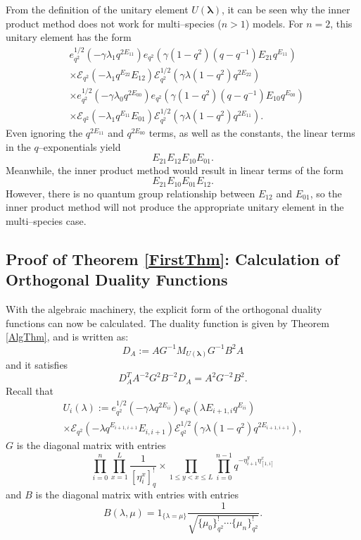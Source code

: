 \documentclass{ximera}
\begin{document}
\begin{remark}\label{InnerProductRemark}
From the definition of the unitary element $U(\boldsymbol{\lambda})$, it can be seen why the inner product method does not work for multi--species ($n>1$) models. For $n=2$, this unitary element has the form
\begin{align*}
&e_{q^2}^{1/2}(-\gamma \lambda_1 q^{2E_{11}}) e_{q^2}(\gamma (1-q^2)(q-q^{-1})E_{21}q^{E_{11}})\\
&\times\mathcal{E}_{q^2}(-\lambda_1 q^{E_{22}}E_{12}) \mathcal{E}_{q^2}^{1/2}(\gamma \lambda (1-q^2)q^{2E_{22}})\\
&\times e_{q^2}^{1/2}(-\gamma \lambda_0 q^{2E_{00}}) e_{q^2}(\gamma (1-q^2)(q-q^{-1})E_{10}q^{E_{00}}) \\
&\times\mathcal{E}_{q^2}(-\lambda_1 q^{E_{11}}E_{01}) \mathcal{E}_{q^2}^{1/2}(\gamma \lambda (1-q^2)q^{2E_{11}}).
\end{align*}
Even ignoring the $q^{2E_{11}}$ and $q^{2E_{00}}$ terms, as well as the constants, the linear terms in the $q$--exponentials yield
$$
E_{21}E_{12}E_{10}E_{01}.
$$
Meanwhile, the inner product method would result in linear terms of the form
$$
E_{21}E_{10}E_{01}E_{12}.
$$
However, there is no quantum group relationship between $E_{12}$ and $E_{01}$, so the inner product method will not produce the appropriate unitary element in the multi--species case.    
\end{remark}




\subsection{Proof of Theorem \ref{FirstThm}: 
Calculation of Orthogonal Duality Functions}
With the algebraic machinery, the explicit form of the orthogonal duality functions can now be calculated. The duality function is given by Theorem \ref{AlgThm}, and is written as:
$$
D_A:= AG^{-1}M_{U(\boldsymbol\lambda)}G^{-1}B^2A
 $$
 and it satisfies
 $$
D_A^T A^{-2}G^2B^{-2} D_A = A^2G^{-2}B^2.
$$
Recall that 
\begin{multline*}
   U_i(\lambda):=
 {e}_{q^2}^{1/2}\left( -\gamma \lambda q^{2E_{ii}}\right) 
{e}_{q^2} \left(\lambda E_{i+1,i}q^{E_{ii}}\right) \\
\times\mathcal{E}_{q^2}(-\lambda q^{E_{i+1,i+1}}E_{i,i+1}) 
 \mathcal{E}_{q^2}^{1 / 2}\left( \gamma \lambda(1-q^2){q^{2E_{i+1,i+1}}}  \right)   , 
\end{multline*}
 $G$ is the diagonal matrix with entries
\begin{equation*}
\prod_{i=0}^{n} \prod_{x=1}^{L} \frac{1}{\left[\eta_{i}^{x}\right]_{q}^{!}} \times \prod_{1 \leq y<x \leq L} \prod_{i=0}^{n-1} q^{-\eta_{i+1}^{y} \eta_{[1, i]}^{x}}
\end{equation*}
and $B$ is the diagonal matrix with entries with entries 
$$B(\lambda,\mu) = 1_{\{\lambda=\mu\}} \frac{1}{\sqrt{\{\mu_0\}_{q^2}^! \cdots \{\mu_n\}_{q^2}^!}}.$$
\end{document}
